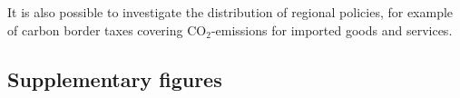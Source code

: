 \documentclass[12pt, a4paper]{article}
\newenvironment{subcaption}
{\strut
\vspace{-5pt}
\begin{minipage}[b]{0.9\textwidth}
  \hspace*{-\parindent}
  \footnotesize}
 {\end{minipage}}
\begin{document}
It is also possible to investigate the distribution of regional policies, for example of carbon border taxes covering CO$_{2}$-emissions for imported goods and services. 

\clearpage

\renewcommand\thefigure{\thesection.\arabic{figure}}
\renewcommand\thetable{\thesection.\arabic{table}}
\setcounter{figure}{0}
\setcounter{table}{0}

\subsection{Supplementary figures} \label{sec:figures}







\end{document}
